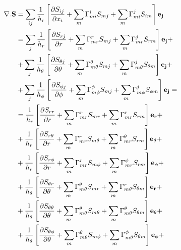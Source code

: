 \documentclass[11pt]{article}
\begin{document}
\begin{align}
\nabla . {\bf{S}} & =  \sum_{ij} \frac{1}{h_i} \left[ \frac{\partial S_{ij}}{\partial x_i} + \sum_m \Gamma_{mi}^i S_{mj} + \sum_m \Gamma_{mi}^j S_{im} \right] {\bf{e_j}} \\
 & = \sum_j \frac{1}{h_r} \left[ \frac{\partial S_{rj}}{\partial r} + \sum_m \Gamma_{mr}^r S_{mj} + \sum_m \Gamma_{mr}^j S_{rm} \right]{\bf{e_j}} + \\
 & + \sum_j \frac{1}{h_\theta} \left[ \frac{\partial S_{\theta j}}{\partial \theta} + \sum_m \Gamma_{m \theta}^\theta S_{mj} + \sum_m \Gamma_{m \theta}^j S_{\theta m} \right]{\bf{e_j}} + \\
 & + \sum_j \frac{1}{h_\phi} \left[ \frac{\partial S_{\phi j}}{\partial \phi} + \sum_m \Gamma_{m\phi}^\phi S_{mj} + \sum_m \Gamma_{m \phi}^j S_{\phi m} \right]{\bf{e_j}} = \\
& = \frac{1}{h_r} \left[ \frac{\partial S_{rr}}{\partial r} + \sum_m \Gamma_{mr}^r S_{mr} + \sum_m \Gamma_{mr}^r S_{rm} \right]{\bf{e_r}} + \\
& + \frac{1}{h_r} \left[ \frac{\partial S_{r\theta}}{\partial r} + \sum_m \Gamma_{mr}^r S_{m\theta} + \sum_m \Gamma_{mr}^\theta S_{rm} \right]{\bf{e_\theta}} + \\
& + \frac{1}{h_r} \left[ \frac{\partial S_{r\phi}}{\partial r} + \sum_m \Gamma_{mr}^r S_{m\phi} + \sum_m \Gamma_{mr}^\phi S_{rm} \right]{\bf{e_\phi}} + \\
& + \frac{1}{h_\theta} \left[ \frac{\partial S_{\theta r}}{\partial \theta} + \sum_m \Gamma_{m\theta}^\theta S_{mr} + \sum_m \Gamma_{m\theta}^r S_{\theta m} \right]{\bf{e_r}} +\\
& + \frac{1}{h_\theta} \left[ \frac{\partial S_{\theta \theta}}{\partial \theta} + \sum_m \Gamma_{m\theta}^\theta S_{m \theta} + \sum_m \Gamma_{m\theta}^\theta S_{\theta m} \right]{\bf{e_\theta}} + \\
& + \frac{1}{h_\theta} \left[ \frac{\partial S_{\theta \phi}}{\partial \theta} + \sum_m \Gamma_{m\theta}^\theta S_{m \phi} + \sum_m \Gamma_{m\theta}^\phi S_{\theta m} \right]{\bf{e_\phi}} + 
\end{align}
\end{document}
